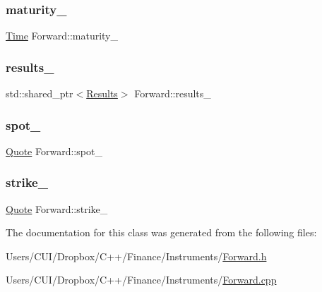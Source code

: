 \subsubsection{\texorpdfstring{maturity\+\_\+}{maturity\_}}
{\footnotesize\ttfamily \hyperlink{_name_def_8h_ac2d3e0ba793497bcca555c7c2cf64ff3}{Time} Forward\+::maturity\+\_\+\hspace{0.3cm}{\ttfamily [private]}}

\hypertarget{class_forward_abead12e748980177fb67f98bcffbf817}{}\label{class_forward_abead12e748980177fb67f98bcffbf817} 
\subsubsection{\texorpdfstring{results\+\_\+}{results\_}}
{\footnotesize\ttfamily std\+::shared\+\_\+ptr$<$\hyperlink{class_forward_1_1_results}{Results}$>$ Forward\+::results\+\_\+}

\hypertarget{class_forward_a362d0396ceda462e504f77120339f8b0}{}\label{class_forward_a362d0396ceda462e504f77120339f8b0} 
\subsubsection{\texorpdfstring{spot\+\_\+}{spot\_}}
{\footnotesize\ttfamily \hyperlink{_name_def_8h_a642a6c5fd87319d922637de0e0bb0305}{Quote} Forward\+::spot\+\_\+\hspace{0.3cm}{\ttfamily [private]}}

\hypertarget{class_forward_a17c32d0a673c13fd92288b1720a43b76}{}\label{class_forward_a17c32d0a673c13fd92288b1720a43b76} 
\subsubsection{\texorpdfstring{strike\+\_\+}{strike\_}}
{\footnotesize\ttfamily \hyperlink{_name_def_8h_a642a6c5fd87319d922637de0e0bb0305}{Quote} Forward\+::strike\+\_\+\hspace{0.3cm}{\ttfamily [private]}}



The documentation for this class was generated from the following files\+:\begin{DoxyCompactItemize}
\item 
Users/\+C\+U\+I/\+Dropbox/\+C++/\+Finance/\+Instruments/\hyperlink{_forward_8h}{Forward.\+h}\item 
Users/\+C\+U\+I/\+Dropbox/\+C++/\+Finance/\+Instruments/\hyperlink{_forward_8cpp}{Forward.\+cpp}\end{DoxyCompactItemize}
